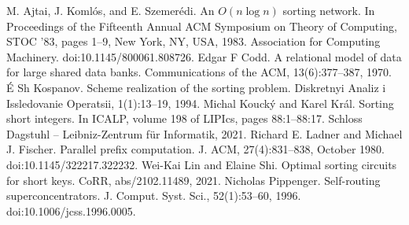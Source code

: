 
 M. Ajtai, J. Koml\'os, and E. Szemer\'edi. An $O(n\log n)$ sorting network. In Proceedings of the Fifteenth Annual ACM Symposium on Theory of Computing, STOC '83, pages 1--9, New York, NY, USA, 1983. Association for Computing Machinery. doi:10.1145/800061.808726.
 Edgar F Codd. A relational model of data for large shared data banks. Communications of the ACM, 13(6):377--387, 1970.
 \'E Sh Kospanov. Scheme realization of the sorting problem. Diskretnyi Analiz i Issledovanie Operatsii, 1(1):13--19, 1994.
 Michal Kouck\'y and Karel Kr\'al. Sorting short integers. In ICALP, volume 198 of LIPIcs, pages 88:1--88:17. Schloss Dagstuhl -- Leibniz-Zentrum f\"ur Informatik, 2021.
 Richard E. Ladner and Michael J. Fischer. Parallel prefix computation. J. ACM, 27(4):831--838, October 1980. doi:10.1145/322217.322232.
 Wei-Kai Lin and Elaine Shi. Optimal sorting circuits for short keys. CoRR, abs/2102.11489, 2021.
 Nicholas Pippenger. Self-routing superconcentrators. J. Comput. Syst. Sci., 52(1):53--60, 1996. doi:10.1006/jcss.1996.0005.


